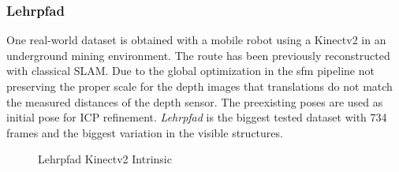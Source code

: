 \subsubsection{Lehrpfad}

One real-world dataset is obtained with a mobile robot using a Kinectv2 in an underground mining environment.
The route has been previously reconstructed with classical SLAM.
Due to the global optimization in the \gls{sfm} pipeline not preserving the proper scale for the depth images that translations do not match the measured distances of the depth sensor.
The preexisting poses are used as initial pose for ICP refinement.
\emph{Lehrpfad} is the biggest tested dataset with 734 frames and the biggest variation in the visible structures.
\begin{figure}[H]
\CenterFloatBoxes%
\begin{floatrow}
    {\caption{Lehrpfad Kinectv2 Intrinsic}\label{tab:lehrpfad_intrinsic}}%
\end{floatrow}
\end{figure}
